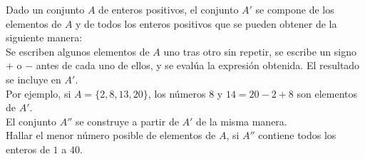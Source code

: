 Dado un conjunto $A$ de enteros positivos, el conjunto $A'$ se compone de los elementos de $A$ y de todos los enteros positivos que se pueden obtener de la siguiente manera: \\
Se escriben algunos elementos de $A$ uno tras otro sin repetir, se escribe un signo $+ $ o $-$ antes de cada uno de ellos, y se evalúa la expresión obtenida. El resultado se incluye en $A'$. \\
Por ejemplo, si $A = \{2,8,13,20\}$, los números $8$ y $14 = 20-2+8$ son elementos de $A'$. \\
El conjunto $A''$ se construye a partir de $A'$ de la misma manera. \\
Hallar el menor número posible de elementos de $A$, si $A''$ contiene todos los enteros de $1$ a $40$. 